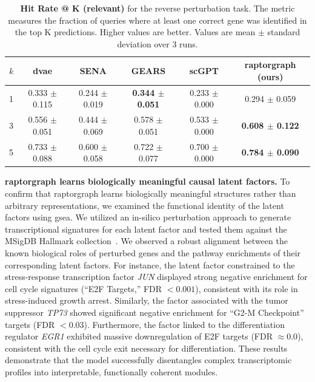 \begin{table}[!ht]
\centering
\caption{\textbf{Hit Rate @ K (relevant)} for the reverse perturbation task.
The metric measures the fraction of queries where at least one correct gene was identified in the top K predictions.
Higher values are better.
Values are mean $\pm$ standard deviation over 3 runs.}
\begin{tabular}{lccccc}
\toprule
$k$ & \gls{dvae} & SENA & GEARS & scGPT & \gls{raptorgraph} (ours) \\
\midrule
1 & 0.333 $\pm$ 0.115 & 0.244 $\pm$ 0.019 & \textbf{0.344 $\pm$ 0.051} & 0.233 $\pm$ 0.000 & 0.294 $\pm$ 0.059 \\
3 & 0.556 $\pm$ 0.051 & 0.444 $\pm$ 0.069 & 0.578 $\pm$ 0.051 & 0.533 $\pm$ 0.000 & \textbf{0.608 $\pm$ 0.122} \\
5 & 0.733 $\pm$ 0.088 & 0.600 $\pm$ 0.058 & 0.722 $\pm$ 0.077 & 0.700 $\pm$ 0.000 & \textbf{0.784 $\pm$ 0.090} \\
\bottomrule
\end{tabular}
\label{tab:hit_rate}
\end{table}

\textbf{\gls{raptorgraph} learns biologically meaningful causal latent factors.} To confirm that \gls{raptorgraph} learns biologically meaningful structures rather than arbitrary representations, we examined the functional identity of the latent factors using \gls{gsea}.
We utilized an in-silico perturbation approach to generate transcriptional signatures for each latent factor and tested them against the MSigDB Hallmark collection~\cite{liberzon_molecular_2015}.
We observed a robust alignment between the known biological roles of perturbed genes and the pathway enrichments of their corresponding latent factors.
For instance, the latent factor constrained to the stress-response transcription factor \textit{JUN} displayed strong negative enrichment for cell cycle signatures (``E2F Targets,'' FDR $< 0.001$), consistent with its role in stress-induced growth arrest.
Similarly, the factor associated with the tumor suppressor \textit{TP73} showed significant negative enrichment for ``G2-M Checkpoint'' targets (FDR $< 0.03$).
Furthermore, the factor linked to the differentiation regulator \textit{EGR1} exhibited massive downregulation of E2F targets (FDR $\approx 0.0$), consistent with the cell cycle exit necessary for differentiation.
These results demonstrate that the model successfully disentangles complex transcriptomic profiles into interpretable, functionally coherent modules.

